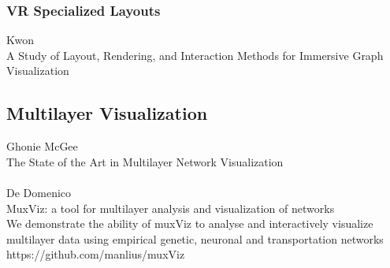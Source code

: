 \subsubsection{VR Specialized Layouts}
Kwon\\
A Study of Layout, Rendering, and Interaction Methods for Immersive Graph Visualization\\


\subsection{Multilayer Visualization}
Ghonie McGee\\
The State of the Art in Multilayer Network Visualization\\
\\
De Domenico\\
MuxViz: a tool for multilayer analysis and visualization of networks\\
We demonstrate the ability of muxViz to analyse and interactively visualize multilayer data using empirical genetic, neuronal and transportation networks https://github.com/manlius/muxViz\\
\\

